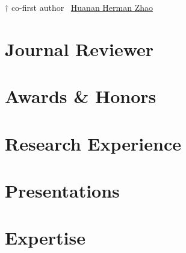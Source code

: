 \documentclass[11pt]{article} %
\begin{document}
\small
$\dagger$ co-first author \hspace{2em}  \scholarsocialsymbol ~\href{https://scholar.google.com/citations?user=ojSVoWQAAAAJ&hl}{Huanan Herman Zhao}





% 

\nocite{*} %
\printbibliography[
    type=article, %
    heading=none, %
    resetnumbers=true, %
]

\section*{Journal Reviewer}


\section*{Awards \& Honors}
\label{awards}


\section*{Research Experience}
\label{exp_research}


\section*{Presentations}
\label{presentations}




\section*{Expertise}
\label{expertise}



% 
\end{document}
